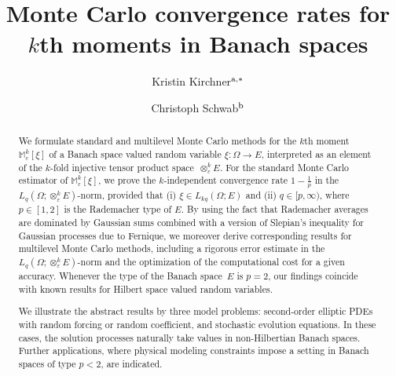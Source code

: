 \documentclass[reqno]{amsart}
\numberwithin{equation}{section}
\theoremstyle{remark}
\theoremstyle{definition}
\begin{document}

\title[Monte Carlo methods for moments in Banach spaces]
	{Monte Carlo convergence rates for $k$th moments  
		in Banach spaces}  


\author{Kristin Kirchner$^{{\lowercase\mathrm{a}},*}$ 
	\and 
	Christoph Schwab$^{\lowercase\mathrm{b}}$}

\address[Kristin Kirchner]{$\,^{\lowercase\mathrm{a}}$Delft 
	Institute of Applied Mathematics, 
	Delft University of Technology\\
	P.O.~Box 5031,  2600$\,$GA Delft, 
	The Netherlands\\
	$\,^{*}$Corresponding author; 
	e-mail: {\normalfont\texttt{k.kirchner@tudelft.nl}}}

\address[Christoph Schwab]{
	$\,^{\lowercase\mathrm{b}}$Seminar for Applied Mathematics, 
	ETH Z\"urich \\
	R\"amistrasse 101, 8092 Z\"urich,  
	Switzerland}


\begin{abstract}
We formulate standard and multilevel Monte Carlo methods for  
the $k$th moment $\mathbb{M}^k_\varepsilon[\xi]$ 
of a Banach space valued random variable 
$\xi\colon\Omega\to E$, 
interpreted as an element 
of the $k$-fold injective 
tensor product space~$\otimes^k_\varepsilon E$. 
For the standard Monte Carlo estimator of 
$\mathbb{M}^k_\varepsilon[\xi]$, 
we prove the $k$-independent convergence rate 
$1-\tfrac{1}{p}$ 
in the $L_q(\Omega;\otimes^k_\varepsilon E)$-norm,  
provided that 
(i) $\xi\in L_{kq}(\Omega;E)$  
and 
(ii) $q\in[p,\infty)$, where $p\in[1,2]$ is  
the Rademacher type of $E$. 
% 
By using the fact that 
Rademacher averages 
are dominated by Gaussian sums 
combined with 
a version of Slepian's inequality for Gaussian processes 
due to Fernique, 
we moreover derive 
corresponding results 
for multilevel Monte Carlo methods, 
including a rigorous error estimate 
in the $L_q(\Omega;\otimes^k_\varepsilon E)$-norm 
and the optimization of the computational cost  
for a given accuracy.  
Whenever the type of the 
Banach space~$E$ is $p=2$, 
our findings coincide with known results 
for Hilbert space valued random variables. 

We illustrate the abstract results 
by three model problems: 
second-order elliptic PDEs with 
random forcing or random coefficient, 
and stochastic evolution equations.
In these cases, the 
solution processes naturally take values 
in non-Hilbertian Banach spaces. 
Further applications, where physical modeling
constraints impose a setting in Banach spaces 
of type $p<2$, are indicated. 
\end{abstract}
\end{document}
